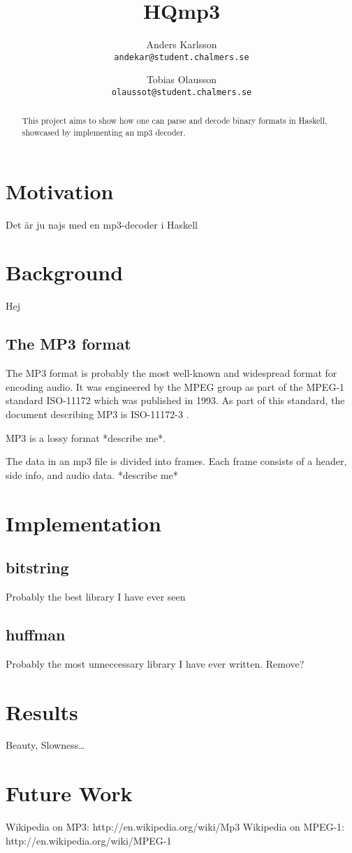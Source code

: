 \documentclass[a4paper,12pt]{article}
\title{HQmp3}
\author{Anders Karlsson \\ \small{\texttt{andekar@student.chalmers.se}}
   \and Tobias Olausson \\ \small{\texttt{olaussot@student.chalmers.se}}
}
\begin{document}
\maketitle

\begin{abstract}
    This project aims to show how one can parse and decode binary formats in
    Haskell, showcased by implementing an mp3 decoder.
\end{abstract}

\tableofcontents

\section{Motivation}
    Det är ju najs med en mp3-decoder i Haskell

\section{Background}
    Hej
    \subsection{The MP3 format}
       The MP3 format is probably the most well-known and widespread format for
       encoding audio. It was engineered by the MPEG group as part of the MPEG-1
       standard ISO-11172 which was published in 1993. As part of this standard,
       the document describing MP3 is ISO-11172-3 \cite{wikimp3,wikimpeg1}.

       MP3 is a lossy format *describe me*.

       The data in an mp3 file is divided into frames. Each frame consists of
       a header, side info, and audio data. *describe me*

\section{Implementation}
    \subsection{bitstring}
        Probably the best library I have ever seen
    \subsection{huffman}
        Probably the most unneccessary library I have ever written. Remove?

\section{Results}
    Beauty, Slowness\ldots

\section{Future Work}

\begin{thebibliography}{99}
        Wikipedia on MP3: http://en.wikipedia.org/wiki/Mp3
        Wikipedia on MPEG-1: http://en.wikipedia.org/wiki/MPEG-1
\end{thebibliography}
\end{document}
